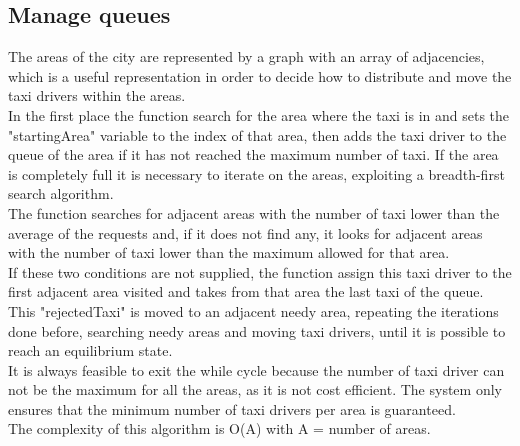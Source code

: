 				\subsection{Manage queues} The areas of the city are represented by a graph with an array of adjacencies, which is a useful representation in order to decide how to distribute and move the taxi drivers within the areas.\\
			In the first place the function search for the area where the taxi is in and sets the "startingArea" variable to the index of that area, then adds the taxi driver to the queue of the area if it has not reached the maximum number of taxi. If the area is completely full it is necessary to iterate on the areas, exploiting a breadth-first search algorithm.\\The function searches for adjacent areas with the number of taxi lower than the average of the requests and, if it does not find any, it looks for adjacent areas with the number of taxi lower than the maximum allowed for that area.\\ If these two conditions are not supplied, the function assign this taxi driver to the first adjacent area visited and takes from that area the last taxi of the queue. This "rejectedTaxi" is moved to an adjacent needy area, repeating the iterations done before, searching needy areas and moving taxi drivers, until it is possible to reach an equilibrium state.\\
			It is always feasible to exit the while cycle because the number of taxi driver can not be the maximum for all the areas, as it is not cost efficient. The system only ensures that the minimum number of taxi drivers per area is guaranteed.\\
			The complexity of this algorithm is O(A) with A = number of areas.
			\\\\
			
